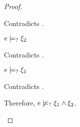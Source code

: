 \begin{proof}
\begin{byCases}
\begin{byCases}
\begin{byCases}
\begin{pfsteps*}
            \end{pfsteps*}
            Contradicts .
        \item[\text{(\ref{rule:CMSAnd2})}]
            \begin{pfsteps*}
            \item $e \models_{?} \xi_2$ 
            \end{pfsteps*}
            Contradicts .
        \item[\text{(\ref{rule:CMSAnd3})}]
            \begin{pfsteps*}
            \item $e \models_{?} \xi_1$ 
            \end{pfsteps*}
            Contradicts .
        \end{byCases}
        Therefore, $e \not\models_{?} \xi_1 \wedge \xi_2$.
        

\end{byCases}
\end{byCases}
\end{proof}
